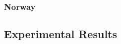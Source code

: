 \subsubsection{Norway}

\subsection{Experimental Results}
\label{sec:experimentalResults}

\begin{comment}
Results should be clearly displayed and should provide a suitable representation of your results for the points you wish to make.
Graphs should be labeled in a legible font. If more than one result is displayed in the same graph, then these should be clearly marked.
Please choose carefully rather than presenting every result.
Too much information is hard to read and often hides the key information you wish to present.
Make use of statistical methods when presenting results, where possible to strengthen the results.
Further, the format of the presentation of results should be chosen based on what issues in the results you wish to highlight.
You may wish to present a subset in the experimental section and provide additional results in an appendix.
If there are specific points related to one experiment that you want to discuss in more detail, it could be reasonable to do
that already in this section; however, save the main overall discussion for Section~\ref{sec:Discussion}.
\end{comment}